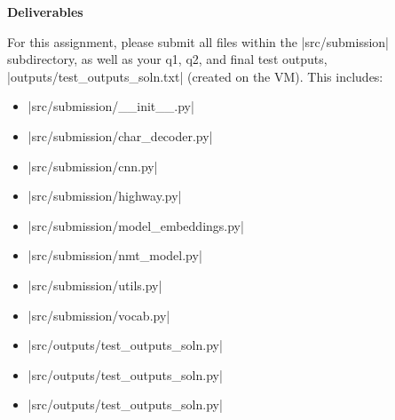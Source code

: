 \textbf{Deliverables}

For this assignment, please submit all files within the |src/submission| subdirectory, as well as your q1, q2, and final test outputs, |outputs/test_outputs_soln.txt| (created on the VM).  This includes:
\begin{itemize}
    \item |src/submission/__init__.py|
    \item |src/submission/char_decoder.py|
    \item |src/submission/cnn.py|
    \item |src/submission/highway.py|
    \item |src/submission/model_embeddings.py|
    \item |src/submission/nmt_model.py|
    \item |src/submission/utils.py|
    \item |src/submission/vocab.py|
    \item |src/outputs/test_outputs_soln.py|
    \item |src/outputs/test_outputs_soln.py|
    \item |src/outputs/test_outputs_soln.py|
\end{itemize}   
